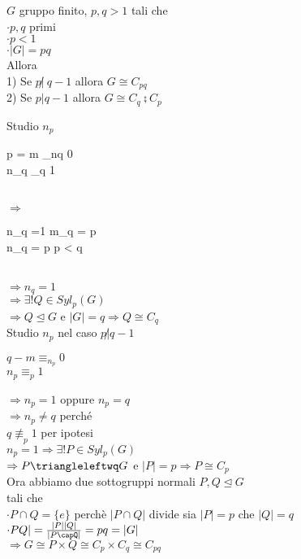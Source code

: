 \documentclass[12px]{article}
\begin{document}
	\begin{teo}
		$G$ gruppo finito, $p,q > 1$ tali che \\
		 $\cdot p,q$ primi\\
		 $\cdot p < 1$\\
		  $\cdot|G| = pq$ \\
		  Allora\\
		  1) Se $p\not | \ q-1$ allora  $G\cong C_{pq}$\\
		  2) Se  $p | q-1$ allora  $G\cong C_q\semi C_p$
	\end{teo}
	\begin{dimo}
		Studio $n_p$ \\
		\begin{cases}
			p = m \equiv_{nq} 0\\
			n_q \equiv_q 1
		\end{cases}\\
		$ \Rightarrow $ \begin{cases}
			n_q =1  m_q = p\\
			 n_q = p \text{ perchè } p < q

		\end{cases}\\
		$ \Rightarrow n_q = 1$ \\
		$ \Rightarrow \exists ! Q\in Syl_p(G)$\\
		$ \Rightarrow Q\trianglelefteq G$ e $|G| = q \Rightarrow Q\cong C_q$\\
		Studio $n_p$ nel caso $p\not | q -1$\\
		 \begin{cases}
			 $q-m \equiv_{n_p} 0$\\
			  $n_p\equiv_p 1$
		\end{cases}
		$ \Rightarrow n_p = 1$ oppure $n_p = q$\\
		 $ \Rightarrow n_p\neq q$ perché\\
		 $q\not\equiv_p 1$ per ipotesi\\
		  $n_p = 1 \Rightarrow \exists ! P\in Syl_p(G)$ \\
		  $ \Rightarrow P\triangleleftwq G$ e $|P| = p \Rightarrow P\cong C_p$ \\
		  Ora abbiamo due sottogruppi normali $P,Q\trianglelefteq G$\\
		  tali che\\
	  $\cdot P\cap Q = \{e\}$  perchè  $|P\cap Q|$ divide sia  $|P| = p$ che $|Q| = q$\\
	  $\cdot PQ| = \frac{|P||Q|}{|P\capQ|} = pq = |G|$\\
$ \Rightarrow G\cong P\times Q\cong C_p\times C_q\cong C_{pq}$


\end{dimo}
\end{document}
